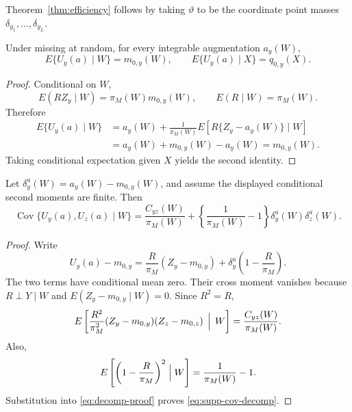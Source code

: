Theorem~\ref{thm:efficiency} follows by taking \(\vartheta\) to be the coordinate point masses \(\delta_{y_1},\ldots,\delta_{y_L}\).

\begin{lemma}
\label{lem:augmentation}
Under missing at random, for every integrable augmentation \(a_y(W)\),
\[
E\{U_y(a)\mid W\}=m_{0,y}(W),
\qquad
E\{U_y(a)\mid X\}=q_{0,y}(X).
\]
\end{lemma}

\begin{proof}
Conditional on \(W\),
\[
E(RZ_y\mid W)=\pi_M(W)m_{0,y}(W),
\qquad
E(R\mid W)=\pi_M(W).
\]
Therefore
\[
\begin{aligned}
E\{U_y(a)\mid W\}
&=a_y(W)+\frac1{\pi_M(W)}
E[R\{Z_y-a_y(W)\}\mid W]\\
&=a_y(W)+m_{0,y}(W)-a_y(W)
=m_{0,y}(W).
\end{aligned}
\]
Taking conditional expectation given \(X\) yields the second identity.
\end{proof}

\begin{lemma}
\label{lem:cov-decomp}
Let \(\delta_y^a(W)=a_y(W)-m_{0,y}(W)\), and assume the displayed conditional second moments are finite. Then
\begin{equation}
\operatorname{Cov}\{U_y(a),U_z(a)\mid W\}
=
\frac{C_{yz}(W)}{\pi_M(W)}
+
\left\{\frac1{\pi_M(W)}-1\right\}
\delta_y^a(W)\delta_z^a(W).
\label{eq:supp-cov-decomp}
\end{equation}
\end{lemma}

\begin{proof}
Write
\begin{equation}
U_y(a)-m_{0,y}
=
\frac{R}{\pi_M}(Z_y-m_{0,y})
+
\delta_y^a\left(1-\frac{R}{\pi_M}\right).
\label{eq:decomp-proof}
\end{equation}
The two terms have conditional mean zero. Their cross moment vanishes because \(R\perp Y\mid W\) and \(E(Z_y-m_{0,y}\mid W)=0\). Since \(R^2=R\),
\[
E\left[
\frac{R^2}{\pi_M^2}
(Z_y-m_{0,y})(Z_z-m_{0,z})
\,\Bigm|\,W
\right]
=
\frac{C_{yz}(W)}{\pi_M(W)}.
\]
Also,
\[
E\left[\left(1-\frac{R}{\pi_M}\right)^2\Bigm|W\right]
=
\frac1{\pi_M(W)}-1.
\]
Substitution into \eqref{eq:decomp-proof} proves \eqref{eq:supp-cov-decomp}.
\end{proof}

